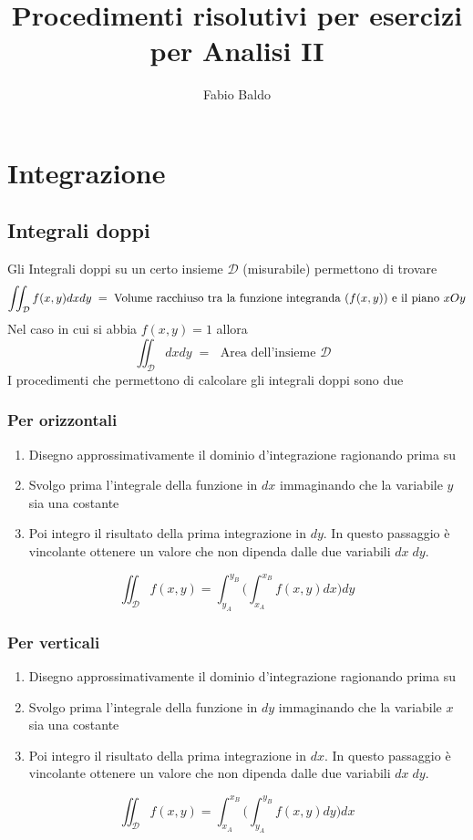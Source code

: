 \documentclass[10pt,a4paper]{report}
\author{Fabio Baldo}
\title{Procedimenti risolutivi per esercizi per Analisi II}
\begin{document}
	\section*{Integrazione}
	
		\subsection*{Integrali doppi}
			Gli Integrali doppi su un certo insieme $ \mathcal{D} $ (misurabile) permettono di trovare
			\[ \iint_{\mathcal{D}} f(x,y)dxdy \; = \; \text{Volume racchiuso tra la funzione integranda ($ f(x,y) $) e il piano $ xOy $} \]
			Nel caso in cui si abbia $ f(x,y) = 1 $ allora 
			\[ \iint_{\mathcal{D}} dxdy \; = \; \text{ Area dell'insieme $\mathcal{D}$  }\]
			I procedimenti che permettono di calcolare gli integrali doppi sono due
				\subsubsection{Per orizzontali}
				\begin{enumerate}
					\item Disegno approssimativamente il dominio d'integrazione ragionando prima su
					\item Svolgo prima l'integrale della funzione in $ dx $ immaginando che la variabile $ y $ sia una costante
					\item Poi integro il risultato della prima integrazione in $ dy $. In questo passaggio è vincolante ottenere un valore che non dipenda dalle due variabili $ dx \; dy $.
				\end{enumerate}
				\[ \iint_{\mathcal{D}} f(x,y) = \int_{y_{A}}^{y_{B}} \Big(\int_{x_{A}}^{x_{B}}f(x,y) dx\Big) dy \]
				\subsubsection{Per verticali}
				\begin{enumerate}
					\item Disegno approssimativamente il dominio d'integrazione ragionando prima su
					\item Svolgo prima l'integrale della funzione in $ dy $ immaginando che la variabile $ x $ sia una costante
					\item Poi integro il risultato della prima integrazione in $ dx $. In questo passaggio è vincolante ottenere un valore che non dipenda dalle due variabili $ dx \; dy $.
				\end{enumerate}
				\[ \iint_{\mathcal{D}} f(x,y) = \int_{x_{A}}^{x_{B}} \Big(\int_{y_{A}}^{y_{B}}f(x,y) dy\Big) dx \]
				
\end{document}

